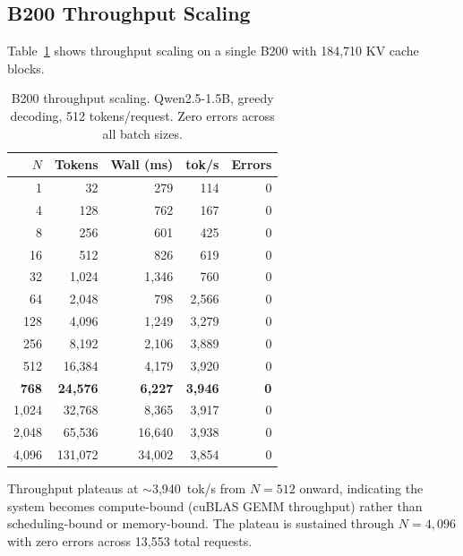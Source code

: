 \documentclass[11pt,a4paper]{article}
\newcommand{\thead}[1]{\textbf{\color{white}#1}}
\begin{document}
\subsection{B200 Throughput Scaling}

Table~\ref{tab:b200} shows throughput scaling on a single B200 with 184{,}710 KV
cache blocks.

\begin{table}[t]
  \centering
  \caption{B200 throughput scaling. Qwen2.5-1.5B, greedy decoding, 512 tokens/request. Zero errors across all batch sizes.}
  \label{tab:b200}
  \small
  \begin{tabular}{@{}rrrrr@{}}
    \toprule
    \rowcolor{HeaderBlue} \thead{$N$} & \thead{Tokens} & \thead{Wall (ms)} & \thead{tok/s} & \thead{Errors} \\
    \midrule
    1     & 32      & 279     & 114    & 0 \\
    \rowcolor{gray!8}
    4     & 128     & 762     & 167    & 0 \\
    8     & 256     & 601     & 425    & 0 \\
    \rowcolor{gray!8}
    16    & 512     & 826     & 619    & 0 \\
    32    & 1{,}024  & 1{,}346 & 760    & 0 \\
    \rowcolor{gray!8}
    64    & 2{,}048  & 798     & 2{,}566 & 0 \\
    128   & 4{,}096  & 1{,}249 & 3{,}279 & 0 \\
    \rowcolor{gray!8}
    256   & 8{,}192  & 2{,}106 & 3{,}889 & 0 \\
    512   & 16{,}384 & 4{,}179 & 3{,}920 & 0 \\
    \rowcolor{gray!8}
    \textbf{768} & \textbf{24{,}576} & \textbf{6{,}227} & \textbf{3{,}946} & \textbf{0} \\
    1{,}024 & 32{,}768 & 8{,}365 & 3{,}917 & 0 \\
    \rowcolor{gray!8}
    2{,}048 & 65{,}536 & 16{,}640 & 3{,}938 & 0 \\
    4{,}096 & 131{,}072 & 34{,}002 & 3{,}854 & 0 \\
    \bottomrule
  \end{tabular}
\end{table}

Throughput plateaus at $\sim$3{,}940~tok/s from $N\!=\!512$ onward, indicating
the system becomes compute-bound (cuBLAS GEMM throughput) rather than
scheduling-bound or memory-bound. The plateau is sustained through $N\!=\!4{,}096$
with zero errors across 13{,}553 total requests.
\end{document}
